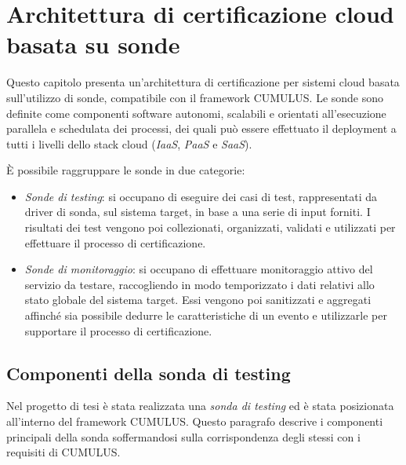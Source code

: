 \documentclass[../main.tex]{subfiles}
\begin{document}
\chapter{Architettura di certificazione cloud basata su sonde}
Questo capitolo presenta un'architettura di certificazione per sistemi cloud basata sull'utilizzo di sonde, compatibile con il framework CUMULUS.
Le sonde sono definite come componenti software autonomi, scalabili e orientati all'esecuzione parallela e schedulata dei processi, dei quali può essere effettuato il deployment a tutti i livelli dello stack cloud (\textit{IaaS}, \textit{PaaS} e \textit{SaaS}).

\`E possibile raggruppare le sonde in due categorie:
\begin{itemize}
\item \textit{Sonde di testing}: si occupano di eseguire dei casi di test, rappresentati da driver di sonda, sul sistema target, in base a una serie di input forniti. I risultati dei test vengono poi collezionati, organizzati, validati e utilizzati per effettuare il processo di certificazione.
\item \textit{Sonde di monitoraggio}: si occupano di effettuare monitoraggio attivo del servizio da testare, raccogliendo in modo temporizzato i dati relativi allo stato globale del sistema target. Essi vengono poi sanitizzati e aggregati affinché sia possibile dedurre le caratteristiche di un evento e utilizzarle per supportare il processo di certificazione.
\end{itemize}
\newpage
\section{Componenti della sonda di testing}
Nel progetto di tesi è stata realizzata una \textit{sonda di testing} ed è stata posizionata all'interno del framework CUMULUS.
Questo paragrafo descrive i componenti principali della sonda soffermandosi sulla corrispondenza degli stessi con i requisiti di CUMULUS.
\end{document}
